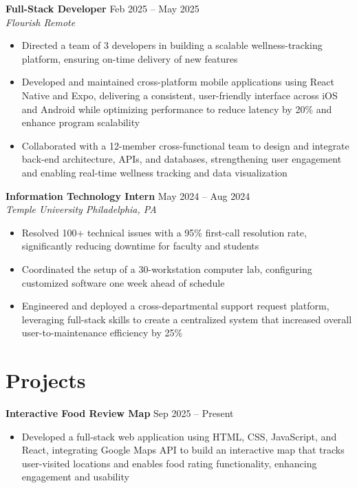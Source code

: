\documentclass[letterpaper,11pt]{article}
\begin{document}
\normalsize{\textbf{Full-Stack Developer} \hfill Feb 2025 -- May 2025} \\
\footnotesize{\textit{Flourish \hfill Remote}}
\vspace{-5pt}
\begin{itemize}
  \item Directed a team of 3 developers in building a scalable wellness-tracking platform, ensuring on-time delivery of new features
  \item Developed and maintained cross-platform mobile applications using React Native and Expo, delivering a consistent, user-friendly interface across iOS and Android while optimizing performance to reduce latency by 20\% and enhance program scalability
  \item Collaborated with a 12-member cross-functional team to design and integrate back-end architecture, APIs, and databases, strengthening user engagement and enabling real-time wellness tracking and data visualization
\end{itemize}

\normalsize{\textbf{Information Technology Intern} \hfill May 2024 -- Aug 2024} \\
\footnotesize{\textit{Temple University \hfill Philadelphia, PA}}
\vspace{-5pt}
\begin{itemize}
  \item Resolved 100+ technical issues with a 95\% first-call resolution rate, significantly reducing downtime for faculty and students
  \item Coordinated the setup of a 30-workstation computer lab, configuring customized software one week ahead of schedule
  \item Engineered and deployed a cross-departmental support request platform, leveraging full-stack skills to create a centralized system that increased overall user-to-maintenance efficiency by 25\%
\end{itemize}
\vspace{-7pt}
\section{Projects}
\normalsize{\textbf{Interactive Food Review Map}} \hfill Sep 2025 -- Present
\vspace{-5pt}
\begin{itemize}
  \item Developed a full-stack web application using HTML, CSS, JavaScript, and React, integrating Google Maps API to build an interactive map that tracks user-visited locations and enables food rating functionality, enhancing engagement and usability
\end{itemize}
\end{document}
